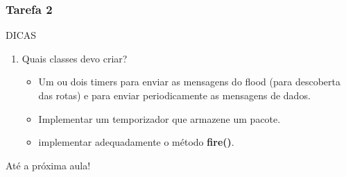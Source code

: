 \documentclass{beamer}
\begin{document}
\begin{frame}
	\frametitle{Tarefa 2}
	\begin{block}{DICAS}
		\begin{enumerate}
			\item Quais classes devo criar?
			\begin{itemize}
				\item Um ou dois timers para enviar as mensagens do flood (para descoberta das rotas) e para enviar periodicamente as mensagens de dados.
				\item Implementar um temporizador que armazene um pacote.
				\item implementar adequadamente o método \textbf{fire()}.
			\end{itemize}
		\end{enumerate}
	\end{block}
\end{frame}

\begin{frame}
\begin{center}
	Até a próxima aula!
\end{center}
	
\end{frame}


\end{document}
